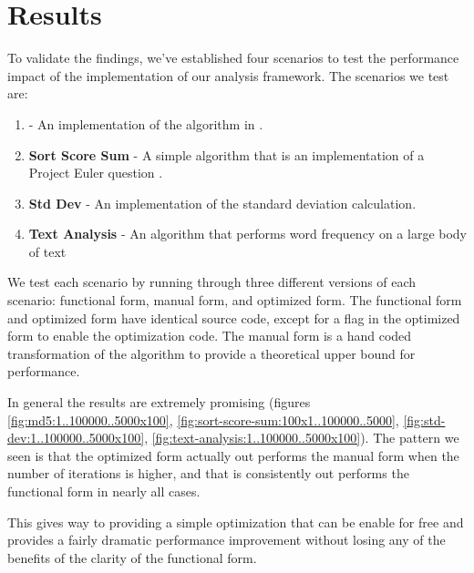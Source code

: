 \section{Results}
To validate the findings, we've established four scenarios to test the performance impact of the implementation of our analysis framework. The scenarios we test are:
\begin{enumerate}
  \item \textbf{\mdfive} - An implementation of the \mdfive\cite{mdfive92} algorithm in \javascript.
  \item \textbf{Sort Score Sum} - A simple algorithm that is an implementation of a Project Euler question \cite{euler05}.
  \item \textbf{Std Dev} - An implementation of the standard deviation calculation.
  \item \textbf{Text Analysis} - An algorithm that performs word frequency on a large body of text   
\end{enumerate}

We test each scenario by running through three different versions of each scenario: functional form, manual form, and optimized form.  The functional form and optimized form have identical source code, except for a flag in the optimized form to enable the optimization code.  The manual form is a hand coded transformation of the algorithm to provide a theoretical upper bound for performance.

In general the results are extremely promising (figures \ref{fig:md5:1..100000..5000x100}, \ref{fig:sort-score-sum:100x1..100000..5000}, \ref{fig:std-dev:1..100000..5000x100}, \ref{fig:text-analysis:1..100000..5000x100}). The pattern we seen is that the optimized form actually out performs the manual form when the number of iterations is higher, and that is consistently out performs the functional form in nearly all cases.

This gives way to providing a simple optimization that can be enable for free and provides a fairly dramatic performance improvement without losing any of the benefits of the clarity of the functional form. 